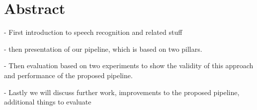 


\chapter{Abstract}
- First introduction to speech recognition and related stuff

- then presentation of our pipeline, which is based on two pillars.

- Then evaluation based on two experiments to show the validity of this approach and performance of the proposed pipeline.

- Lastly we will discuss further work, improvements to the proposed pipeline, additional things to evaluate